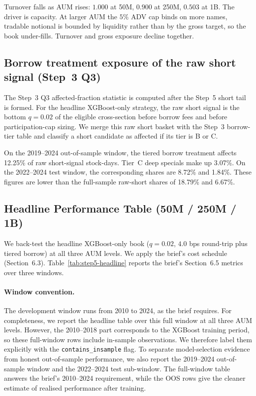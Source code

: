 \documentclass[12pt]{article}
\begin{document}
Turnover falls as AUM rises: $1.000$ at 50M, $0.900$ at 250M, $0.503$ at 1B. The driver is
capacity. At larger AUM the $5\%$ ADV cap binds on more names, tradable notional is bounded
by liquidity rather than by the gross target, so the book under-fills. Turnover and gross exposure decline together.

\subsection{Borrow treatment exposure of the raw short signal (Step~3 Q3)}

The Step~3 Q3 affected-fraction statistic is computed after the Step~5 short tail is formed. For the headline XGBoost-only strategy, the raw short signal is the bottom $q=0.02$ of the eligible cross-section before borrow fees and before participation-cap sizing. We merge this raw short basket with the Step~3 borrow-tier table and classify a short candidate as affected if its tier is B or C.

On the 2019--2024 out-of-sample window, the tiered borrow treatment affects 12.25\% of raw short-signal stock-days. Tier~C deep specials make up 3.07\%. On the 2022--2024 test window, the corresponding shares are 8.72\% and 1.84\%. These figures are lower than the full-sample raw-short shares of 18.79\% and 6.67\%. 

\subsection{Headline Performance Table (50M / 250M / 1B)}
\label{sec:step5q2}

We back-test the headline XGBoost-only book ($q=0.02$, $4.0$ bps round-trip plus tiered
borrow) at all three AUM levels. We apply the brief's cost schedule (Section~6.3).
Table~\ref{tab:step5-headline} reports the brief's Section~6.5 metrics over three windows.

\paragraph{Window convention.}
The development window runs from 2010 to 2024, as the brief requires. For completeness, we report the headline table over this full window at all three AUM levels. However, the 2010--2018 part corresponds to the XGBoost training period, so these full-window rows include in-sample observations. We therefore label them explicitly with the \texttt{contains\_insample} flag. To separate model-selection evidence from honest out-of-sample performance, we also report the 2019--2024 out-of-sample window and the 2022--2024 test sub-window. The full-window table answers the brief's 2010--2024 requirement, while the OOS rows give the cleaner estimate of realised performance after training.
\end{document}
